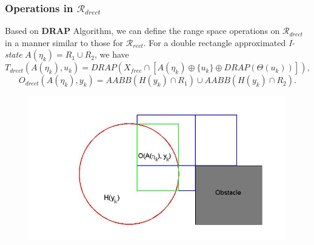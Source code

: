 \documentclass[compress]{beamer}
\begin{document}
\begin{frame} \frametitle{Operations in $\mathcal{R}_{drect}$}

Based on \textbf{DRAP} Algorithm, we can define the range space operations on
$\mathcal{R}_{drect}$ in a manner similar to those for $\mathcal{R}_{rect}$.  For a double rectangle
approximated \emph{I-state} $A(\eta_k) = R_1 \cup R_2$, we have
\begin{equation}
	T_{drect}(A(\eta_k), u_k) = DRAP(X_{free} \cap [A(\eta_k) \oplus \{ u_k \} \oplus DRAP(\Theta(u_k))]),
\end{equation}
\begin{equation}
	O_{drect}(A(\eta_k), y_k) = AABB(H(y_k) \cap R_1)\cup AABB(H(y_k) \cap R_2).
\end{equation}
\begin{figure}
    \includegraphics[scale=0.3]{drectevolve4.jpg}
    \end{figure}
\transboxout
\end{frame}
\end{document}
